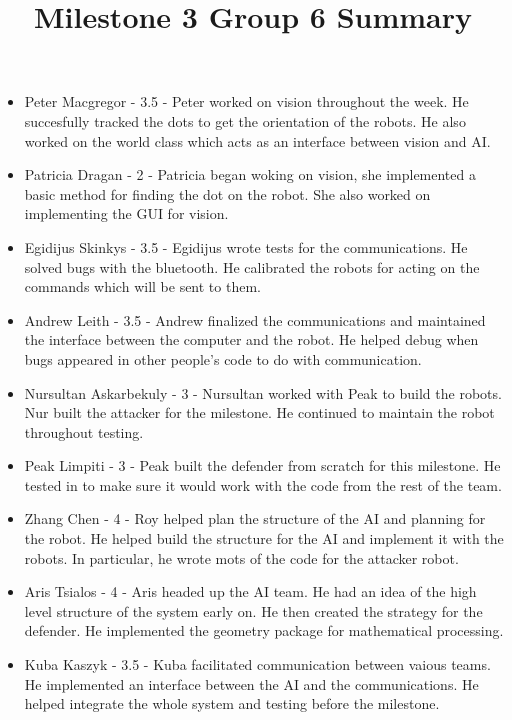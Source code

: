 \documentclass[dvips]{article}
\begin{document}
\sloppy

\title{Milestone 3 Group 6 Summary}
 
\maketitle
\begin{itemize}
\item Peter Macgregor - 3.5 - Peter worked on vision throughout the week. He succesfully tracked the dots to get the orientation of the robots. He also worked on the world class which acts as an interface between vision and AI.
\item Patricia Dragan - 2 - Patricia began woking on vision, she implemented a basic method for finding the dot on the robot. She also worked on implementing the GUI for vision.
\item Egidijus Skinkys - 3.5 - Egidijus wrote tests for the communications. He solved bugs with the bluetooth. He calibrated the robots for acting on the commands which will be sent to them. 
\item Andrew Leith - 3.5 - Andrew finalized the communications and maintained the interface between the computer and the robot. He helped debug when bugs appeared in other people's code to do with communication.
\item Nursultan Askarbekuly - 3 - Nursultan worked with Peak to build the robots. Nur built the attacker for the milestone. He continued to maintain the robot throughout testing.
\item Peak Limpiti - 3 - Peak built the defender from scratch for this milestone. He tested in to make sure it would work with the code from the rest of the team.
\item Zhang Chen - 4 - Roy helped plan the structure of the AI and planning for the robot. He helped build the structure for the AI and implement it with the robots. In particular, he wrote mots of the code for the attacker robot.
\item Aris Tsialos - 4 - Aris headed up the AI team. He had an idea of the high level structure of the system early on. He then created the strategy for the defender. He implemented the geometry package for mathematical processing.
\item Kuba Kaszyk - 3.5 - Kuba facilitated communication between vaious teams. He implemented an interface between the AI and the communications. He helped integrate the whole system and testing before the milestone.
\end{itemize}
\end{document}
